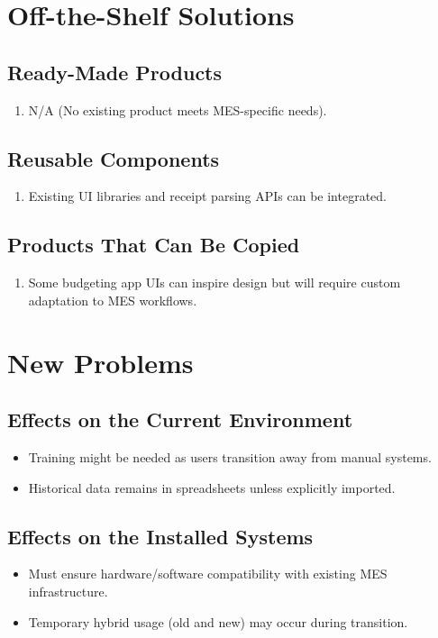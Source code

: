 \documentclass[12pt]{article}
\begin{document}
\section{Off-the-Shelf Solutions}
\subsection{Ready-Made Products}
\begin{enumerate}
  \item N/A (No existing product meets MES-specific needs).
\end{enumerate}

\subsection{Reusable Components}
\begin{enumerate}
  \item Existing UI libraries and receipt parsing APIs can be integrated.
\end{enumerate}

\subsection{Products That Can Be Copied}
\begin{enumerate}
  \item Some budgeting app UIs can inspire design but will require custom adaptation to MES workflows.
\end{enumerate}

\section{New Problems}
\subsection{Effects on the Current Environment}
\begin{itemize}
    \item Training might be needed as users transition away from manual systems.
    \item Historical data remains in spreadsheets unless explicitly imported.
\end{itemize}

\subsection{Effects on the Installed Systems}
\begin{itemize}
    \item Must ensure hardware/software compatibility with existing MES infrastructure.
    \item Temporary hybrid usage (old and new) may occur during transition.
\end{itemize}
\end{document}
